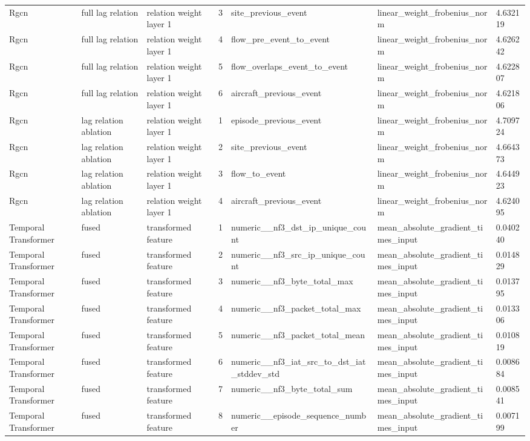 \begin{table}
\begin{tabular}{lllrlll}
Rgcn & full lag relation & relation weight layer 1 & 3 & site\_previous\_event & linear\_weight\_frobenius\_norm & 4.632119 \\
Rgcn & full lag relation & relation weight layer 1 & 4 & flow\_pre\_event\_to\_event & linear\_weight\_frobenius\_norm & 4.626242 \\
Rgcn & full lag relation & relation weight layer 1 & 5 & flow\_overlaps\_event\_to\_event & linear\_weight\_frobenius\_norm & 4.622807 \\
Rgcn & full lag relation & relation weight layer 1 & 6 & aircraft\_previous\_event & linear\_weight\_frobenius\_norm & 4.621806 \\
Rgcn & lag relation ablation & relation weight layer 1 & 1 & episode\_previous\_event & linear\_weight\_frobenius\_norm & 4.709724 \\
Rgcn & lag relation ablation & relation weight layer 1 & 2 & site\_previous\_event & linear\_weight\_frobenius\_norm & 4.664373 \\
Rgcn & lag relation ablation & relation weight layer 1 & 3 & flow\_to\_event & linear\_weight\_frobenius\_norm & 4.644923 \\
Rgcn & lag relation ablation & relation weight layer 1 & 4 & aircraft\_previous\_event & linear\_weight\_frobenius\_norm & 4.624095 \\
Temporal Transformer & fused & transformed feature & 1 & numeric\_\_nf3\_dst\_ip\_unique\_count & mean\_absolute\_gradient\_times\_input & 0.040240 \\
Temporal Transformer & fused & transformed feature & 2 & numeric\_\_nf3\_src\_ip\_unique\_count & mean\_absolute\_gradient\_times\_input & 0.014829 \\
Temporal Transformer & fused & transformed feature & 3 & numeric\_\_nf3\_byte\_total\_max & mean\_absolute\_gradient\_times\_input & 0.013795 \\
Temporal Transformer & fused & transformed feature & 4 & numeric\_\_nf3\_packet\_total\_max & mean\_absolute\_gradient\_times\_input & 0.013306 \\
Temporal Transformer & fused & transformed feature & 5 & numeric\_\_nf3\_packet\_total\_mean & mean\_absolute\_gradient\_times\_input & 0.010819 \\
Temporal Transformer & fused & transformed feature & 6 & numeric\_\_nf3\_iat\_src\_to\_dst\_iat\_stddev\_std & mean\_absolute\_gradient\_times\_input & 0.008684 \\
Temporal Transformer & fused & transformed feature & 7 & numeric\_\_nf3\_byte\_total\_sum & mean\_absolute\_gradient\_times\_input & 0.008541 \\
Temporal Transformer & fused & transformed feature & 8 & numeric\_\_episode\_sequence\_number & mean\_absolute\_gradient\_times\_input & 0.007199 \\
\bottomrule
\end{tabular}
\end{table}
